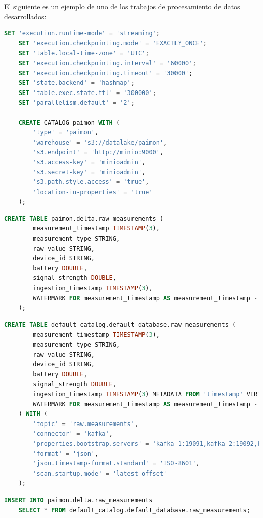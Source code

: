 El siguiente es un ejemplo de uno de los trabajos de procesamiento de datos desarrollados:

\begin{lstlisting}[language=sql]
    SET 'execution.runtime-mode' = 'streaming';
    SET 'execution.checkpointing.mode' = 'EXACTLY_ONCE';
    SET 'table.local-time-zone' = 'UTC';
    SET 'execution.checkpointing.interval' = '60000';
    SET 'execution.checkpointing.timeout' = '30000';
    SET 'state.backend' = 'hashmap';
    SET 'table.exec.state.ttl' = '300000';
    SET 'parallelism.default' = '2';

    CREATE CATALOG paimon WITH (
        'type' = 'paimon',
        'warehouse' = 's3://datalake/paimon',
        's3.endpoint' = 'http://minio:9000',
        's3.access-key' = 'minioadmin',  
        's3.secret-key' = 'minioadmin',
        's3.path.style.access' = 'true',
        'location-in-properties' = 'true'
    );
\end{lstlisting}

\begin{lstlisting}[language=sql]
    CREATE TABLE paimon.delta.raw_measurements (
        measurement_timestamp TIMESTAMP(3),
        measurement_type STRING,
        raw_value STRING,
        device_id STRING,
        battery DOUBLE,
        signal_strength DOUBLE,
        ingestion_timestamp TIMESTAMP(3),
        WATERMARK FOR measurement_timestamp AS measurement_timestamp - INTERVAL '10' SECONDS
    );
\end{lstlisting}

\newpage

\begin{lstlisting}[language=sql]
    CREATE TABLE default_catalog.default_database.raw_measurements (
        measurement_timestamp TIMESTAMP(3),
        measurement_type STRING,
        raw_value STRING,
        device_id STRING,
        battery DOUBLE,
        signal_strength DOUBLE,
        ingestion_timestamp TIMESTAMP(3) METADATA FROM 'timestamp' VIRTUAL,
        WATERMARK FOR measurement_timestamp AS measurement_timestamp - INTERVAL '10' SECONDS
    ) WITH (
        'topic' = 'raw.measurements',
        'connector' = 'kafka',
        'properties.bootstrap.servers' = 'kafka-1:19091,kafka-2:19092,kafka-3:19093',
        'format' = 'json',
        'json.timestamp-format.standard' = 'ISO-8601',
        'scan.startup.mode' = 'latest-offset'
    );
\end{lstlisting}

\begin{lstlisting}[language=sql]
    INSERT INTO paimon.delta.raw_measurements
    SELECT * FROM default_catalog.default_database.raw_measurements;
\end{lstlisting}

